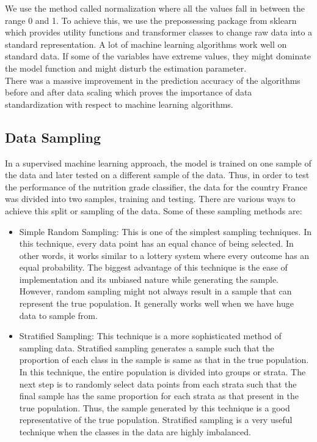 \documentclass[sigconf]{acmart}
\begin{document}
We use the method called normalization where all the values fall in between the range 0 and 1. To achieve this, we use the prepossessing package from sklearn which provides utility functions and transformer classes to change raw data into a standard representation. A lot of machine learning algorithms work well on standard data. If some of the variables have extreme values, they might dominate the model function and might disturb the estimation parameter. \\

There was a massive improvement in the prediction accuracy of the algorithms before and after data scaling which proves the importance of data standardization with respect to machine learning algorithms.

\subsection{Data Sampling}
In a supervised machine learning approach, the model is trained on one sample of the data and later tested on a different sample of the data. Thus, in order to test the performance of the nutrition grade classifier, the data for the country France was divided into two samples, training and testing. There are various ways to achieve this split or sampling of the data. Some of these sampling methods are:

\begin{itemize}
	\item Simple Random Sampling: This is one of the simplest sampling techniques. In this technique, every data point has an equal chance of being selected. In other words, it works similar to a lottery system where every outcome has an equal probability. The biggest advantage of this technique is the ease of implementation and its unbiased nature while generating the sample. However, random sampling might not always result in a sample that can represent the true population. It generally works well when we have huge data to sample from.
	\item Stratified Sampling: This technique is a more sophisticated method of sampling data. Stratified sampling generates a sample such that the proportion of each class in the sample is same as that in the true population. In this technique, the entire population is divided into groups or strata. The next step is to randomly select data points from each strata such that the final sample has the same proportion for each strata as that present in the true population. Thus, the sample generated by this technique is a good representative of the true population. Stratified sampling is a very useful technique when the classes in the data are highly imbalanced. 
\end{itemize}
\end{document}
